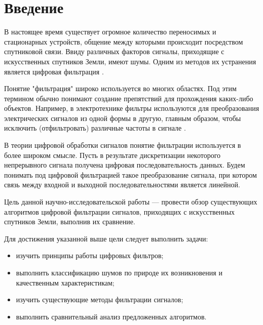 \chapter*{Введение}

В настоящее время существует огромное количество переносимых и стационарных устройств, общение между которыми происходит посредством спутниковой связи. Ввиду различных факторов сигналы, приходящие с искусственных спутников Земли, имеют шумы. Одним из методов их устранения является цифровая фильтрация \cite{intro}.

Понятие "фильтрация" широко используется во многих областях. Под этим термином обычно понимают создание препятствий для прохождения каких-либо объектов. Например, в электротехнике фильтры используются для преобразования электрических сигналов из одной формы в другую, главным образом, чтобы исключить (отфильтровать) различные частоты в сигнале \cite{aft}.

В теории цифровой обработки сигналов понятие фильтрации используется в  более широком смысле. Пусть в результате дискретизации некоторого непрерывного сигнала получена цифровая последовательность данных. Будем понимать под цифровой фильтрацией такое преобразование сигнала, при котором связь между  входной  и выходной последовательностями является линейной.


Цель данной научно-исследовательской работы --- провести обзор существующих алгоритмов цифровой фильтрации сигналов, приходящих с искусственных спутников Земли, выполнив их сравнение.

Для достижения указанной выше цели следует выполнить задачи:
\begin{itemize}
	\item изучить принципы работы цифровых фильтров;
	\item выполнить классификацию шумов по природе их возникновения и качественным характеристикам;
	\item изучить существующие методы фильтрации сигналов;
	\item выполнить сравнительный анализ предложенных алгоритмов.
\end{itemize}


